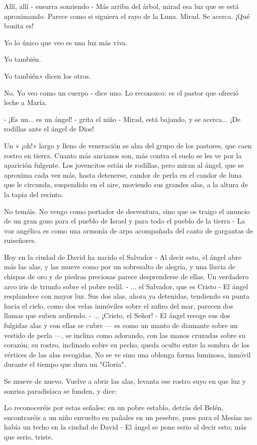 \documentclass[12pt, twoside, openright]{book} %
\begin{document}
Allí, allí - susurra sonriendo - Más arriba del árbol, mirad esa luz que se está aproximando. Parece como si siguiera el rayo de la Luna. Mirad. Se acerca. ¡Qué bonita es! 

Yo lo único que veo es una luz más viva. 

Yo también. 

Yo también» dicen los otros. 

No. Yo veo como un cuerpo - dice uno. Lo reconozco: es el pastor que ofreció leche a María. 

- ¡Es un... es un ángel! - grita el niño - Mirad, está bajando, y se acerca... ¡De rodillas ante el ángel de Dios! 

Un « ¡oh!» largo y lleno de veneración se alza del grupo de los pastores, que caen rostro en tierra. Cuanto más ancianos son, más contra el suelo se les ve por la aparición fulgente. Los jovencitos están de rodillas, pero miran al ángel, que se aproxima cada vez más, hasta detenerse, candor de perla en el candor de luna que le circunda, suspendido en el aire, moviendo sus grandes alas, a la altura de la tapia del recinto. 

No temáis. No vengo como portador de desventura, sino que os traigo el anuncio de un gran gozo para el pueblo de Israel y para todo el pueblo de la tierra - La voz angélica es como una armonía de arpa acompañada del canto de gargantas de ruiseñores. 

Hoy en la ciudad de David ha nacido el Salvador - Al decir esto, el ángel abre más las alas, y las mueve como por un sobresalto de alegría, y una lluvia de chispas de oro y de piedras preciosas parece desprenderse de ellas. Un verdadero arco iris de triunfo sobre el pobre redil. - ... el Salvador, que es Cristo - El ángel resplandece con mayor luz. Sus dos alas, ahora ya detenidas, tendiendo su punta hacia el cielo, como dos velas inmóviles sobre el zafiro del mar, parecen dos llamas que suben ardiendo. - ... ¡Cristo, el Señor! - El ángel recoge sus dos fulgidas alas y con ellas se cubre — es como un manto de diamante sobre un vestido de perla —, se inclina como adorando, con las manos cruzadas sobre su corazón; su rostro, inclinado sobre su pecho, queda oculto entre la sombra de los vértices de las alas recogidas. No se ve sino una oblonga forma luminosa, inmóvil durante el tiempo que dura un "Gloria". 

Se mueve de nuevo. Vuelve a abrir las alas, levanta ese rostro suyo en que luz y sonrisa paradisíaca se funden, y dice: 

Lo reconoceréis por estas señales: en un pobre establo, detrás del Belén, encontraréis a un niño envuelto en pañales en un pesebre, pues para el Mesías no había un techo en la ciudad de David - El ángel se pone serio al decir esto; más que serio, triste. 
\end{document}

